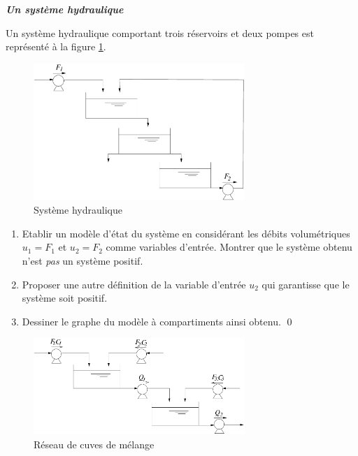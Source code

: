 \begin{exercice}{\bf \em Un système hydraulique}

Un système hydraulique comportant trois réservoirs et deux pompes
est représenté à la figure \ref{Fig:systhydr}.
\begin{figure}[h]
\begin{center}
\includegraphics[width=8cm]{images/systhydr}
\caption{Système hydraulique}
\label{Fig:systhydr}
\end{center} 
\end{figure}
\begin{enumerate}
\item Etablir un modèle d'état du système en considérant les
débits volumétriques $u_1 = F_1$ et $u_2 = F_2$ comme variables
d'entrée. Montrer que le système obtenu n'est {\it pas} un système
positif. 
\item Proposer une autre définition de la variable d'entrée $u_2$ qui
garantisse que le système soit positif. 
\item Dessiner le graphe du modèle à compartiments ainsi obtenu. \qed
\end{enumerate}
\end{exercice}
\vv 

\begin{figure}[!ht] 
\begin{center}
\includegraphics[width=8cm]{images/cuvmel}
\caption{Réseau de cuves de mélange}
\label{Fig:cuvmel}
\end{center} 
\end{figure}

